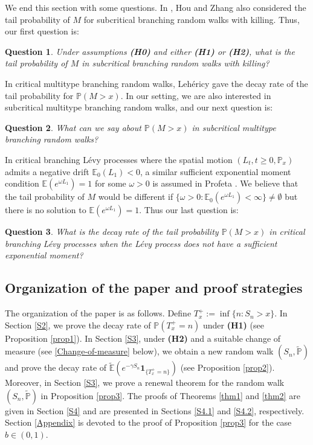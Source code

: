 \documentclass[11pt]{article}
\newtheorem{ques}{Question}
\numberwithin{equation}{section}
\begin{document}
We end this section with some questions. In \cite{HZ2025}, Hou and Zhang also considered the tail probability of $M$ for subcritical branching random walks with killing. Thus, our first question is:
\begin{ques} 
	Under assumptions {\bf(H0)} and either {\bf(H1)} or {\bf(H2)}, what is the tail probability of $M$ in subcritical branching random walks with killing? 
\end{ques}
In critical multitype branching random walks, Leh\'ericy \cite[Section 2.4]{Le2025} gave the decay rate of the tail probability for $\mathbb{P}(M > x)$. In our setting, we are also interested in subcritical multitype branching random walks, and our next question is:
\begin{ques}
	What can we say about $\mathbb{P}(M > x)$ in subcritical multitype branching random walks?
\end{ques}
In critical branching L\'evy processes where the spatial motion $(L_t, t \geq 0, \mathbb{P}_x)$ admits a negative drift $\mathbb{E}_0(L_1) < 0$, a similar sufficient exponential moment condition $\mathbb{E}(e^{\omega L_1}) = 1$ for some $\omega >0$ is assumed in Profeta \cite[Theorem 2]{Profeta2026}. We believe that the tail probability of $M$ would be different if $\{\omega>0: \mathbb{E}_0(e^{\omega L_1})<\infty\}\neq \emptyset$ but there is no solution to $\mathbb{E}(e^{\omega L_1}) = 1$. Thus our last question is:
\begin{ques}
	What is the decay rate of the tail probability $\mathbb{P}(M > x)$ in critical branching L\'evy processes when the L\'evy process does not have a sufficient exponential moment?
\end{ques}



  
 \subsection{Organization of the paper and proof strategies}\label{S1.3}

The organization of the paper is as follows. Define $T_x^+ := \inf\{n: S_n > x\}$. In Section \ref{S2}, we prove the decay rate of $\mathbb{P}(T_x^+ = n)$ under {\bf(H1)} (see Proposition \ref{prop1}). In Section \ref{S3}, under {\bf(H2)} and a suitable change of measure (see \eqref{Change-of-measure} below), we obtain a new random walk $(S_n, \widetilde{\mathbb{P}})$ and prove the decay rate of $\widetilde{\mathbb{E}}(e^{-\gamma S_n} \mathbf{1}_{\{T_x^+ = n\}})$ (see Proposition \ref{prop2}). Moreover, in Section \ref{S3}, we prove a renewal theorem for the random walk $(S_n, \widetilde{\mathbb{P}})$ in Proposition \ref{prop3}. The proofs of Theorems \ref{thm1} and \ref{thm2} are given in Section \ref{S4} and are presented in Sections \ref{S4.1} and \ref{S4.2}, respectively. Section \ref{Appendix} is devoted to the proof of Proposition \ref{prop3} for the case $b \in (0,1)$.
\end{document}
